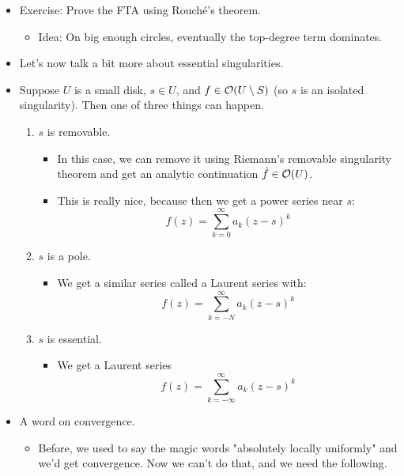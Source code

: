 \documentclass[../notes.tex]{subfiles}
\begin{document}
\begin{itemize}
    \item Exercise: Prove the FTA using Rouch\'{e}'s theorem.
    \begin{itemize}
        \item Idea: On big enough circles, eventually the top-degree term dominates.
    \end{itemize}
    \item Let's now talk a bit more about essential singularities.
    \item Suppose $U$ is a small disk, $s\in U$, and $f\in\mathcal{O}(U\setminus S)$ (so $s$ is an isolated singularity). Then one of three things can happen.
    \begin{enumerate}
        \item $s$ is removable.
        \begin{itemize}
            \item In this case, we can remove it using Riemann's removable singularity theorem and get an analytic continuation $\hat{f}\in\mathcal{O}(U)$.
            \item This is really nice, because then we get a power series near $s$:
            \begin{equation*}
                f(z) = \sum_{k=0}^\infty a_k(z-s)^k
            \end{equation*}
        \end{itemize}
        \item $s$ is a pole.
        \begin{itemize}
            \item We get a similar series called a Laurent series with:
            \begin{equation*}
                f(z) = \sum_{k=-N}^\infty a_k(z-s)^k
            \end{equation*}
        \end{itemize}
        \item $s$ is essential.
        \begin{itemize}
            \item We get a Laurent series
            \begin{equation*}
                f(z) = \sum_{k=-\infty}^\infty a_k(z-s)^k
            \end{equation*}
        \end{itemize}
    \end{enumerate}
    \item A word on convergence.
    \begin{itemize}
        \item Before, we used to say the magic words "absolutely locally uniformly" and we'd get convergence. Now we can't do that, and we need the following.

\end{itemize}
\end{itemize}
\end{document}
